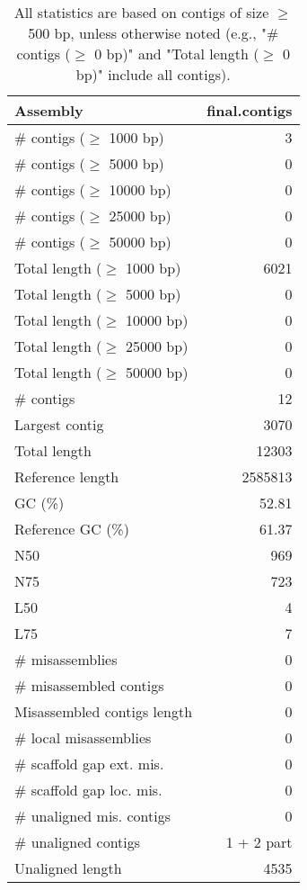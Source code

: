 \documentclass[12pt,a4paper]{article}
\begin{document}
\begin{table}[ht]
\begin{center}
\caption{All statistics are based on contigs of size $\geq$ 500 bp, unless otherwise noted (e.g., "\# contigs ($\geq$ 0 bp)" and "Total length ($\geq$ 0 bp)" include all contigs).}
\begin{tabular}{|l*{1}{|r}|}
\hline
Assembly & final.contigs \\ \hline
\# contigs ($\geq$ 1000 bp) & 3 \\ \hline
\# contigs ($\geq$ 5000 bp) & 0 \\ \hline
\# contigs ($\geq$ 10000 bp) & 0 \\ \hline
\# contigs ($\geq$ 25000 bp) & 0 \\ \hline
\# contigs ($\geq$ 50000 bp) & 0 \\ \hline
Total length ($\geq$ 1000 bp) & 6021 \\ \hline
Total length ($\geq$ 5000 bp) & 0 \\ \hline
Total length ($\geq$ 10000 bp) & 0 \\ \hline
Total length ($\geq$ 25000 bp) & 0 \\ \hline
Total length ($\geq$ 50000 bp) & 0 \\ \hline
\# contigs & 12 \\ \hline
Largest contig & 3070 \\ \hline
Total length & 12303 \\ \hline
Reference length & 2585813 \\ \hline
GC (\%) & 52.81 \\ \hline
Reference GC (\%) & 61.37 \\ \hline
N50 & 969 \\ \hline
N75 & 723 \\ \hline
L50 & 4 \\ \hline
L75 & 7 \\ \hline
\# misassemblies & 0 \\ \hline
\# misassembled contigs & 0 \\ \hline
Misassembled contigs length & 0 \\ \hline
\# local misassemblies & 0 \\ \hline
\# scaffold gap ext. mis. & 0 \\ \hline
\# scaffold gap loc. mis. & 0 \\ \hline
\# unaligned mis. contigs & 0 \\ \hline
\# unaligned contigs & 1 + 2 part \\ \hline
Unaligned length & 4535 \\ \hline

\end{tabular}
\end{center}
\end{table}
\end{document}

